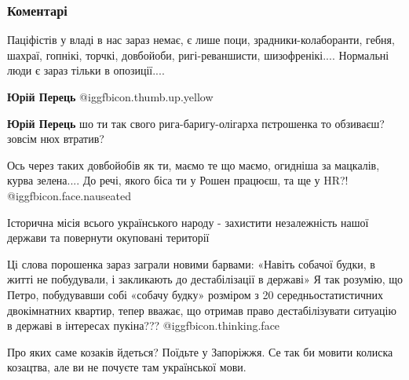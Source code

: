  
 
 
 
 
\subsubsection{Коментарі}
\label{sec:14_10_2021.fb.ruh_oporu_kapituljacii.1.meta_ukrainy_rusimperia.cmt}

\begin{itemize} %

Паціфістів у владі в нас зараз немає, є лише поци, зрадники-колаборанти, гебня,
шахраї, гопнікі, торчкі, довбойоби, ригі-реваншисти, шизофренікі.... Нормальні
люди є зараз тільки в опозиції....

\begin{itemize} %
\textbf{Юрій Перець}  @igg{fbicon.thumb.up.yellow} 

\textbf{Юрій Перець} шо ти так свого рига-баригу-олігарха пєтрошенка то обзиваєш? зовсім нюх втратив?


Ось через таких довбойобів як ти, маємо те що маємо, огидніша за мацкалів, курва зелена....
До речі, якого біса ти у Рошен працюєш, та ще у HR?! @igg{fbicon.face.nauseated} 
\end{itemize} %


Історична місія всього українського народу - захистити незалежність нашої держави та повернути окуповані території


Ці слова порошенка зараз заграли новими барвами:
«Навіть собачої будки, в житті не побудували, і закликають до дестабілізації в державі»
Я так розумію, що Петро, побудувавши собі «собачу будку» розміром з 20 середньостатистичних двокімнатних квартир, тепер вважає, що отримав право дестабілізувати ситуацію в державі в інтересах пукіна???  @igg{fbicon.thinking.face} 


Про яких саме козаків йдеться? Поїдьте у Запоріжжя. Се так би мовити колиска
козацтва, але ви не почуєте там української мови.

\end{itemize} %
